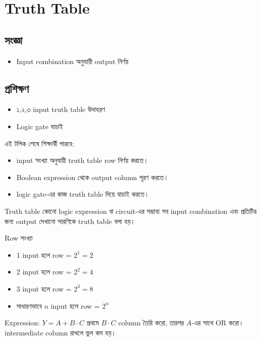 \section{Truth Table}

\subsection{সংজ্ঞা}
\begin{itemize}
\item Input combination অনুযায়ী output নির্ণয়
\end{itemize}

\subsection{প্রশিক্ষণ}
\begin{itemize}
\item ১,২,৩ input truth table উদাহরণ
\item Logic gate যাচাই
\end{itemize}

\begin{learningbox}
এই টপিক শেষে শিক্ষার্থী পারবে:
\begin{itemize}
\item input সংখ্যা অনুযায়ী truth table row নির্ণয় করতে।
\item Boolean expression থেকে output column পূরণ করতে।
\item logic gate-এর কাজ truth table দিয়ে যাচাই করতে।
\end{itemize}
\end{learningbox}

\begin{definitionbox}{Truth table}
কোনো logic expression বা circuit-এর সম্ভাব্য সব input combination এবং প্রতিটির জন্য output দেখানো সারণিকে truth table বলা হয়।
\end{definitionbox}

\begin{keypointbox}{Row সংখ্যা}
\begin{itemize}
\item 1 input হলে row = $2^1=2$
\item 2 input হলে row = $2^2=4$
\item 3 input হলে row = $2^3=8$
\item সাধারণভাবে $n$ input হলে row = $2^n$
\end{itemize}
\end{keypointbox}

\begin{examplebox}{Expression: $Y=A+B\cdot C$}
প্রথমে $B\cdot C$ column তৈরি করো, তারপর $A$-এর সাথে OR করো। intermediate column রাখলে ভুল কম হয়।
\end{examplebox}

\begin{center}
\end{center}
